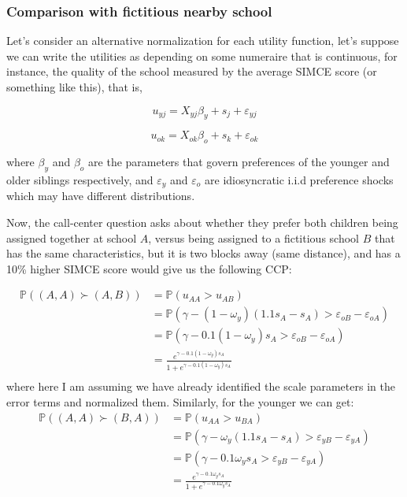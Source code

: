 \documentclass{article}
\begin{document}
\subsubsection{Comparison with fictitious nearby school}

Let's consider an alternative normalization for each utility function, let's suppose we can write the utilities as depending on some numeraire that is continuous, for instance, the quality of the school measured by the average SIMCE score (or something like this), that is, 

\begin{equation}
    u_{yj} = X_{yj}\beta_y + s_j + \varepsilon_{yj}
\end{equation}

\begin{equation}
    u_{ok} = X_{ok}\beta_o + s_k + \varepsilon_{ok}
\end{equation}

where $\beta_y$ and $\beta_o$ are the parameters that govern preferences of the younger and older siblings respectively, and $\varepsilon_{y}$ and $\varepsilon_{o}$ are idiosyncratic i.i.d preference shocks which may have different distributions.  

Now, the call-center question asks about whether they prefer both children being assigned together at school $A$, versus being assigned to a fictitious school $B$ that has the same characteristics, but it is two blocks away (same distance), and has a 10\% higher SIMCE score would give us the following CCP:


\begin{align*}
    \mathbb{P} \left( (A, A)  \succ (A,B)  \right) &=  \mathbb{P} \left( u_{AA} > u_{AB}  \right) \\
    &=  \mathbb{P} \left(  \gamma - (1-\omega_y)(1.1 s_A - s_A) > \varepsilon_{oB} - \varepsilon_{oA} \right)  \\
     &=  \mathbb{P} \left(  \gamma - 0.1(1-\omega_y)s_A > \varepsilon_{oB} - \varepsilon_{oA} \right)  \\
     &=  \frac{e^{\gamma - 0.1(1-\omega_y)s_A}}{1 + e^{\gamma - 0.1(1-\omega_y)s_A}} \\
\end{align*}
where here I am assuming we have already identified the scale parameters in the error terms and normalized them. Similarly, for the younger we can get:
\begin{align*}
    \mathbb{P} \left( (A, A)  \succ (B,A)  \right) &=  \mathbb{P} \left( u_{AA} > u_{BA}  \right) \\
    &=  \mathbb{P} \left(  \gamma - \omega_y(1.1 s_A - s_A) > \varepsilon_{yB} - \varepsilon_{yA} \right)  \\
     &=  \mathbb{P} \left(  \gamma - 0.1\omega_y s_A > \varepsilon_{yB} - \varepsilon_{yA} \right)  \\
     &=  \frac{e^{\gamma - 0.1\omega_ys_A}}{1 + e^{\gamma - 0.1\omega_y s_A}} \\
\end{align*}
\end{document}
